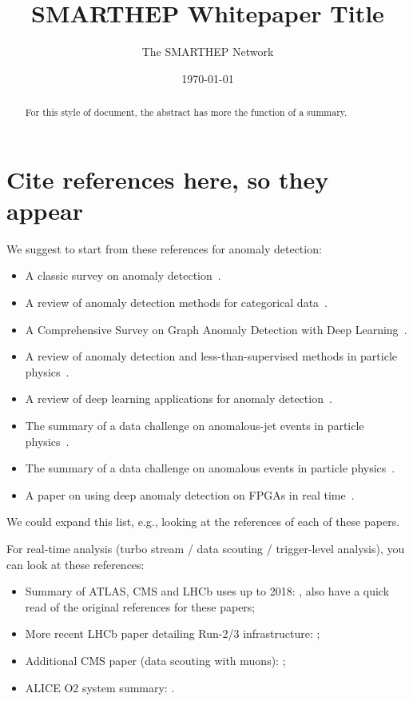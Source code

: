 \documentclass{smarthepnote}
\title{SMARTHEP Whitepaper Title}
\author{The SMARTHEP Network}
\date{\today}
\begin{document}
\maketitle

\begin{abstract}
For this style of document, the abstract has more the function of a summary. 
\end{abstract}

\vfill
\makereviewtable
\clearpage

\section{Cite references here, so they appear}

We suggest to start from these references for anomaly detection:
\begin{itemize}
\item A classic survey on anomaly detection~\cite{Chandola2009}.
\item A review of anomaly detection methods for categorical data~\cite{Thana2019}.
\item A Comprehensive Survey on Graph Anomaly Detection with Deep Learning~\cite{Ma2021}.
\item A review of anomaly detection and less-than-supervised methods in particle physics~\cite{Nachman:2020ccu}.
\item A review of deep learning applications for anomaly detection~\cite{Pang_2021}.
\item The summary of a data challenge on anomalous-jet events in particle physics~\cite{Kasieczka:2021xcg}.
\item The summary of a data challenge on anomalous events in particle physics~\cite{Aarrestad:2021oeb}.
\item A paper on using deep anomaly detection on FPGAs in real time~\cite{Govorkova:2021utb}.
\end{itemize}

We could expand this list, e.g., looking at the references of each of these papers.

For real-time analysis (turbo stream / data scouting / trigger-level analysis), you can look at these references: 

\begin{itemize}
\item Summary of ATLAS, CMS and LHCb uses up to 2018: \cite{Duarte:2018bsd}, also have a quick read of the original references for these papers; 
\item More recent LHCb paper detailing Run-2/3 infrastructure: \cite{Aaij:2019uij};
\item Additional CMS paper (data scouting with muons): \cite{CMS:2019buh};
\item ALICE O2 system summary: \cite{Rohr:2022xcs}. 
\end{itemize}
\end{document}
